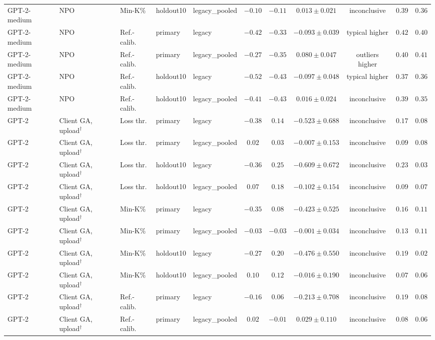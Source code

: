 {\begin{longtable}{@{\extracolsep{\fill}}lllllcccccc@{}}
GPT-2-medium & NPO & Min-K\% & holdout10 & legacy\_pooled & $-0.10$ & $-0.11$ & $0.013 \pm 0.021$ & inconclusive & $0.39$ & $0.36$ \\
GPT-2-medium & NPO & Ref.-calib. & primary & legacy & $-0.42$ & $-0.33$ & $-0.093 \pm 0.039$ & typical higher & $0.42$ & $0.40$ \\
GPT-2-medium & NPO & Ref.-calib. & primary & legacy\_pooled & $-0.27$ & $-0.35$ & $0.080 \pm 0.047$ & outliers higher & $0.40$ & $0.41$ \\
GPT-2-medium & NPO & Ref.-calib. & holdout10 & legacy & $-0.52$ & $-0.43$ & $-0.097 \pm 0.048$ & typical higher & $0.37$ & $0.36$ \\
GPT-2-medium & NPO & Ref.-calib. & holdout10 & legacy\_pooled & $-0.41$ & $-0.43$ & $0.016 \pm 0.024$ & inconclusive & $0.39$ & $0.35$ \\
GPT-2 & Client GA, upload$^{\dagger}$ & Loss thr. & primary & legacy & $-0.38$ & $0.14$ & $-0.523 \pm 0.688$ & inconclusive & $0.17$ & $0.08$ \\
GPT-2 & Client GA, upload$^{\dagger}$ & Loss thr. & primary & legacy\_pooled & $0.02$ & $0.03$ & $-0.007 \pm 0.153$ & inconclusive & $0.09$ & $0.08$ \\
GPT-2 & Client GA, upload$^{\dagger}$ & Loss thr. & holdout10 & legacy & $-0.36$ & $0.25$ & $-0.609 \pm 0.672$ & inconclusive & $0.23$ & $0.03$ \\
GPT-2 & Client GA, upload$^{\dagger}$ & Loss thr. & holdout10 & legacy\_pooled & $0.07$ & $0.18$ & $-0.102 \pm 0.154$ & inconclusive & $0.09$ & $0.07$ \\
GPT-2 & Client GA, upload$^{\dagger}$ & Min-K\% & primary & legacy & $-0.35$ & $0.08$ & $-0.423 \pm 0.525$ & inconclusive & $0.16$ & $0.11$ \\
GPT-2 & Client GA, upload$^{\dagger}$ & Min-K\% & primary & legacy\_pooled & $-0.03$ & $-0.03$ & $-0.001 \pm 0.034$ & inconclusive & $0.13$ & $0.11$ \\
GPT-2 & Client GA, upload$^{\dagger}$ & Min-K\% & holdout10 & legacy & $-0.27$ & $0.20$ & $-0.476 \pm 0.550$ & inconclusive & $0.19$ & $0.02$ \\
GPT-2 & Client GA, upload$^{\dagger}$ & Min-K\% & holdout10 & legacy\_pooled & $0.10$ & $0.12$ & $-0.016 \pm 0.190$ & inconclusive & $0.07$ & $0.06$ \\
GPT-2 & Client GA, upload$^{\dagger}$ & Ref.-calib. & primary & legacy & $-0.16$ & $0.06$ & $-0.213 \pm 0.708$ & inconclusive & $0.19$ & $0.08$ \\
GPT-2 & Client GA, upload$^{\dagger}$ & Ref.-calib. & primary & legacy\_pooled & $0.02$ & $-0.01$ & $0.029 \pm 0.110$ & inconclusive & $0.08$ & $0.06$ \\

\end{longtable}}
